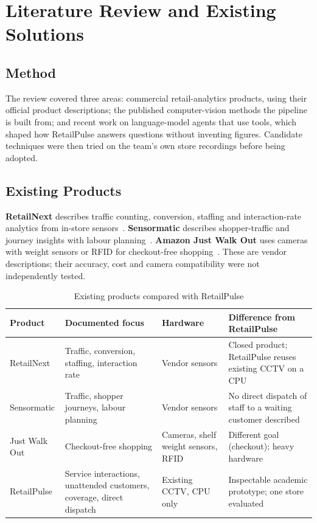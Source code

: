 \chapter{Literature Review and Existing Solutions}
\label{ch:lit}

\section{Method}
The review covered three areas: commercial retail-analytics products, using their official product descriptions; the published computer-vision methods the pipeline is built from; and recent work on language-model agents that use tools, which shaped how RetailPulse answers questions without inventing figures. Candidate techniques were then tried on the team's own store recordings before being adopted.

\section{Existing Products}
\textbf{RetailNext} describes traffic counting, conversion, staffing and interaction-rate analytics from in-store sensors~\cite{retailnextTraffic}. \textbf{Sensormatic} describes shopper-traffic and journey insights with labour planning~\cite{sensormaticInsights}. \textbf{Amazon Just Walk Out} uses cameras with weight sensors or RFID for checkout-free shopping~\cite{amazonJwo}. These are vendor descriptions; their accuracy, cost and camera compatibility were not independently tested.

\begin{table}[H]
\centering
\caption{Existing products compared with RetailPulse}\label{tab:products}
\begin{tabular}{P{0.18\textwidth}P{0.27\textwidth}P{0.23\textwidth}P{0.24\textwidth}}
\toprule
Product & Documented focus & Hardware & Difference from RetailPulse\\
\midrule
RetailNext & Traffic, conversion, staffing, interaction rate & Vendor sensors & Closed product; RetailPulse reuses existing CCTV on a CPU\\
Sensormatic & Traffic, shopper journeys, labour planning & Vendor sensors & No direct dispatch of staff to a waiting customer described\\
Just Walk Out & Checkout-free shopping & Cameras, shelf weight sensors, RFID & Different goal (checkout); heavy hardware\\
RetailPulse & Service interactions, unattended customers, coverage, direct dispatch & Existing CCTV, CPU only & Inspectable academic prototype; one store evaluated\\
\bottomrule
\end{tabular}
\end{table}

